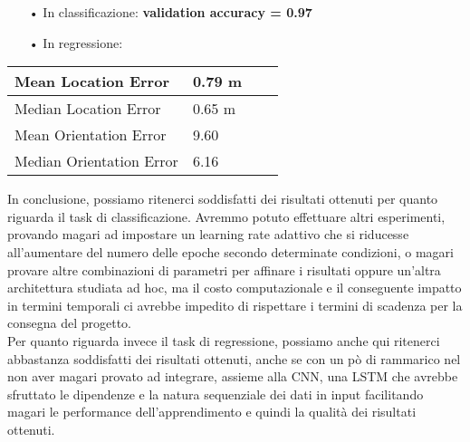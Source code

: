 \begin{itemize}
	\item[•]In classificazione: {\bf validation accuracy = 0.97 }
	\item[•]In regressione:
\end{itemize}
\begin{center}
	\begin{tabular}{| l | l | l | l |}
		\hline
		Mean Location Error & 0.79 m \\ \hline
		Median Location Error & 0.65 m \\ \hline
		Mean Orientation Error & {9.60\textdegree} \\ \hline
		Median Orientation Error & {6.16\textdegree} \\ \hline							
	\end{tabular}
\end{center}
In conclusione, possiamo ritenerci soddisfatti dei risultati ottenuti per quanto riguarda il task di classificazione. Avremmo potuto effettuare altri esperimenti, provando magari ad impostare un learning rate adattivo che si riducesse all’aumentare del numero delle epoche secondo determinate condizioni, o magari provare altre combinazioni di parametri per affinare i risultati oppure un’altra architettura studiata ad hoc, ma il costo computazionale e il conseguente impatto in termini temporali ci avrebbe impedito di rispettare i termini di scadenza per la consegna del progetto.\\
Per quanto riguarda invece il task di regressione, possiamo anche qui ritenerci abbastanza soddisfatti dei risultati ottenuti, anche se con un pò di rammarico nel non aver magari provato ad integrare, assieme alla CNN, una LSTM che avrebbe sfruttato le dipendenze e la natura sequenziale dei dati in input facilitando magari le performance dell’apprendimento e quindi la qualità dei risultati ottenuti.